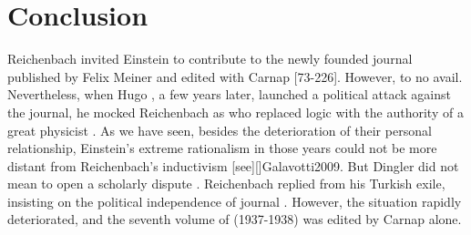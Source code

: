 \documentclass[draft]{article}
\newcommand{\FP}{\german{Fernparallelismus}\xspace}
\begin{document}
\section{Conclusion}




Reichenbach invited Einstein to contribute to the newly founded journal  published by Felix Meiner and edited with Carnap [73-226]. However, to no avail. Nevertheless, when Hugo \citet{Dingler1933}, a few years later, launched a political attack against the journal, he mocked Reichenbach as  who replaced logic with the authority of a great physicist \citep[VI]{Dingler1933}. As we have seen, besides the deterioration of their personal relationship, Einstein's extreme rationalism in those years \citep{Einstein1933} could not be more distant from Reichenbach's inductivism [see][]{Galavotti2009}. But Dingler did not mean to open a scholarly dispute \citep{Howard2003}. Reichenbach replied from his Turkish exile, insisting on the political independence of journal \citep{Reichenbach1934}. However, the situation rapidly deteriorated, and the seventh volume of  (1937-1938) was edited by Carnap alone.
\end{document}
